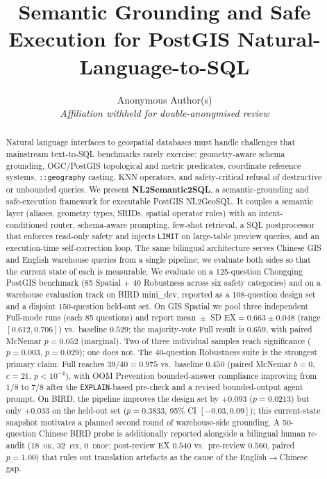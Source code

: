 \documentclass[11pt]{article}
\title{Semantic Grounding and Safe Execution for PostGIS Natural-Language-to-SQL}
\author{Anonymous Author(s)\\ \textit{Affiliation withheld for double-anonymised review}}
\date{}
\begin{document}
\maketitle

\begin{abstract}
Natural language interfaces to geospatial databases must handle challenges that mainstream text-to-SQL benchmarks rarely exercise: geometry-aware schema grounding, OGC/PostGIS topological and metric predicates, coordinate reference systems, \texttt{::geography} casting, KNN operators, and safety-critical refusal of destructive or unbounded queries. We present \textbf{NL2Semantic2SQL}, a semantic-grounding and safe-execution framework for executable PostGIS NL2GeoSQL. It couples a semantic layer (aliases, geometry types, SRIDs, spatial operator rules) with an intent-conditioned router, schema-aware prompting, few-shot retrieval, a SQL postprocessor that enforces read-only safety and injects \texttt{LIMIT} on large-table preview queries, and an execution-time self-correction loop. The same bilingual architecture serves Chinese GIS and English warehouse queries from a single pipeline; we evaluate both sides so that the current state of each is measurable. We evaluate on a 125-question Chongqing PostGIS benchmark (85 Spatial + 40 Robustness across six safety categories) and on a warehouse evaluation track on BIRD mini\_dev, reported as a 108-question design set and a disjoint 150-question held-out set. On GIS Spatial we pool three independent Full-mode runs (each 85 questions) and report mean~$\pm$~SD EX$=0.663 \pm 0.048$ (range $[0.612, 0.706]$) vs.\ baseline $0.529$; the majority-vote Full result is $0.659$, with paired McNemar $p=0.052$ (marginal). Two of three individual samples reach significance ($p=0.003$, $p=0.029$); one does not. The 40-question Robustness suite is the strongest primary claim: Full reaches $39/40 = 0.975$ vs.\ baseline $0.450$ (paired McNemar $b=0$, $c=21$, $p<10^{-4}$), with OOM Prevention bounded-answer compliance improving from $1/8$ to $7/8$ after the \texttt{EXPLAIN}-based pre-check and a revised bounded-output agent prompt. On BIRD, the pipeline improves the design set by $+0.093$ ($p=0.0213$) but only $+0.033$ on the held-out set ($p=0.3833$, 95\% CI $[-0.03, 0.09]$); this current-state snapshot motivates a planned second round of warehouse-side grounding. A 50-question Chinese BIRD probe is additionally reported alongside a bilingual human re-audit (18~\textsc{ok}, 32~\textsc{fix}, 0~\textsc{drop}; post-review EX $0.540$ vs.\ pre-review $0.560$, paired $p=1.00$) that rules out translation artefacts as the cause of the English$\to$Chinese gap.
\end{abstract}
\end{document}
